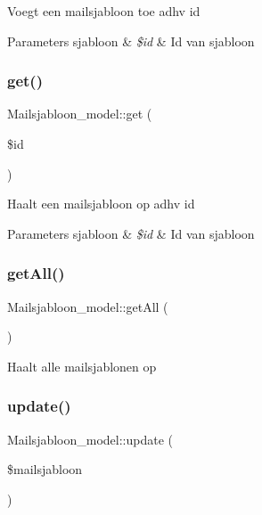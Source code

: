 Voegt een mailsjabloon toe adhv id 
\begin{DoxyParams}[1]{Parameters}
sjabloon & {\em \$id} & Id van sjabloon \\
\hline
\end{DoxyParams}
\mbox{\label{class_mailsjabloon__model_a2fd2620c0951e3b9954e557652b74ff0}} 
\subsubsection{\texorpdfstring{get()}{get()}}
{\footnotesize\ttfamily Mailsjabloon\+\_\+model\+::get (\begin{DoxyParamCaption}\item[{}]{\$id }\end{DoxyParamCaption})}

Haalt een mailsjabloon op adhv id 
\begin{DoxyParams}[1]{Parameters}
sjabloon & {\em \$id} & Id van sjabloon \\
\hline
\end{DoxyParams}
\mbox{\label{class_mailsjabloon__model_a6723ec4f9fa1a3f1195f93f0c9326239}} 
\subsubsection{\texorpdfstring{get\+All()}{getAll()}}
{\footnotesize\ttfamily Mailsjabloon\+\_\+model\+::get\+All (\begin{DoxyParamCaption}{ }\end{DoxyParamCaption})}

Haalt alle mailsjablonen op \mbox{\label{class_mailsjabloon__model_a4272406d2eee5775d951d5320d0618aa}} 
\subsubsection{\texorpdfstring{update()}{update()}}
{\footnotesize\ttfamily Mailsjabloon\+\_\+model\+::update (\begin{DoxyParamCaption}\item[{}]{\$mailsjabloon }\end{DoxyParamCaption})}

